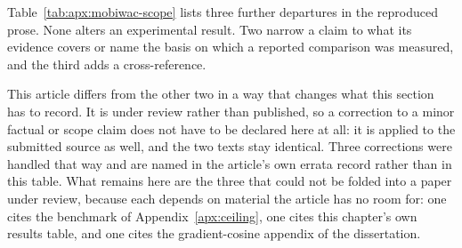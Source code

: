 Table~\ref{tab:apx:mobiwac-scope} lists three further departures in the reproduced prose.
None alters an experimental result. Two narrow a claim to what its evidence covers or name
the basis on which a reported comparison was measured, and the third adds a cross-reference.

This article differs from the other two in a way that changes what this section has to record.
It is under review rather than published, so a correction to a minor factual or scope claim
does not have to be declared here at all: it is applied to the submitted source as well, and
the two texts stay identical. Three corrections were handled that way and are named in the
article's own errata record rather than in this table. What remains here are the three that could
not be folded into a paper under review, because each depends on material the article has no
room for: one cites the benchmark of Appendix~\ref{apx:ceiling}, one cites this
chapter's own results table, and one cites the gradient-cosine appendix of the
dissertation.

